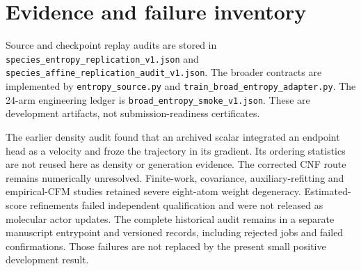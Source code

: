 \section{Evidence and failure inventory}
Source and checkpoint replay audits are stored in
\texttt{species\_entropy\_replication\_v1.json} and
\texttt{species\_affine\_replication\_audit\_v1.json}.
The broader contracts are implemented by \texttt{entropy\_source.py} and
\texttt{train\_broad\_entropy\_adapter.py}. The 24-arm engineering ledger is
\texttt{broad\_entropy\_smoke\_v1.json}. These are development artifacts,
not submission-readiness certificates.

The earlier density audit found that an archived scalar integrated an endpoint
head as a velocity and froze the trajectory in its gradient. Its ordering
statistics are not reused here as density or generation evidence. The
corrected CNF route remains numerically unresolved. Finite-work, covariance,
auxiliary-refitting and empirical-CFM studies retained severe eight-atom
weight degeneracy. Estimated-score refinements failed independent qualification
and were not released as molecular actor updates. The complete historical audit
remains in a separate manuscript entrypoint and versioned records, including
rejected jobs and failed confirmations. Those failures are not replaced by
the present small positive development result.
